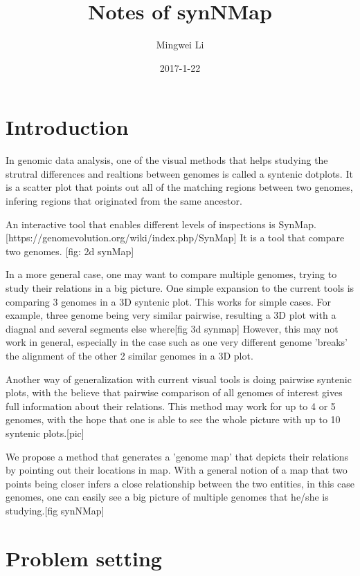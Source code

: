 \documentclass[12pt]{article}
\title{Notes of synNMap}
\date{2017-1-22}
\author{Mingwei Li}
\begin{document}
\maketitle

\newpage
{}
\tableofcontents

\newpage
{}

\section{Introduction}
In genomic data analysis, one of the visual methods that helps studying the strutral differences and realtions between genomes is called a syntenic dotplots. It is a scatter plot that points out all of the matching regions between two genomes, infering regions that originated from the same ancestor.

An interactive tool that enables different levels of inspections is SynMap. [https://genomevolution.org/wiki/index.php/SynMap] It is a tool that compare two genomes. [fig: 2d synMap]

In a more general case, one may want to compare multiple genomes, trying to study their relations in a big picture. One simple expansion to the current tools is comparing 3 genomes in a 3D syntenic plot. This works for simple cases. For example, three genome being very similar pairwise, resulting a 3D plot with a diagnal and several segments else where[fig 3d synmap] However, this may not work in general, especially in the case such as one very different genome 'breaks' the alignment of the other 2 similar genomes in a 3D plot.

Another way of generalization with current visual tools is doing pairwise syntenic plots, with the believe that pairwise comparison of all genomes of interest gives full information about their relations. This method may work for up to 4 or 5 genomes, with the hope that one is able to see the whole picture with up to 10 syntenic plots.[pic]

We propose a method that generates a 'genome map' that depicts their relations by pointing out their locations in map. With a general notion of a map that two points being closer infers a close relationship between the two entities, in this case genomes, one can easily see a big picture of multiple genomes that he/she is studying.[fig synNMap]

\section{Problem setting}
\end{document}
